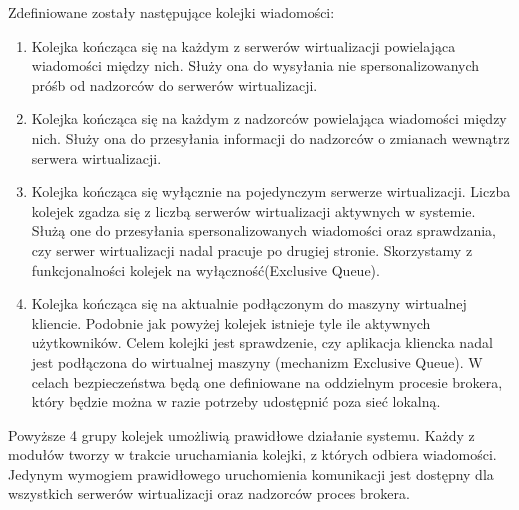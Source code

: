 \documentclass[../opis-rozwiazania.tex]{subfiles}
\begin{document}
Zdefiniowane zostały następujące kolejki wiadomości:
\begin{enumerate}[label=(\Roman*)]
    \item \label{modules:broker:queue-virtsrv} Kolejka kończąca się na każdym z serwerów wirtualizacji powielająca wiadomości między nich.
          Służy ona do wysyłania nie spersonalizowanych próśb od nadzorców do serwerów wirtualizacji.
    \item \label{modules:broker:queue-overseers} Kolejka kończąca się na każdym z nadzorców powielająca wiadomości między nich.
          Służy ona do przesyłania informacji do nadzorców o zmianach wewnątrz serwera wirtualizacji.
    \item \label{modules:broker:queue-exclusive} Kolejka kończąca się wyłącznie na pojedynczym serwerze wirtualizacji.
          Liczba kolejek zgadza się z liczbą serwerów wirtualizacji aktywnych w systemie.
          Służą one do przesyłania spersonalizowanych wiadomości oraz sprawdzania, czy serwer wirtualizacji nadal pracuje po drugiej stronie.
          Skorzystamy z funkcjonalności kolejek na wyłączność(Exclusive Queue\parencite{xrdp-clients}).
    \item \label{modules:broker:queue-users} Kolejka kończąca się na aktualnie podłączonym do maszyny wirtualnej kliencie.
          Podobnie jak powyżej kolejek istnieje tyle ile aktywnych użytkowników.
          Celem kolejki jest sprawdzenie, czy aplikacja kliencka nadal jest podłączona do wirtualnej maszyny (mechanizm Exclusive Queue).
          W celach bezpieczeństwa będą one definiowane na oddzielnym procesie brokera, który będzie można w razie potrzeby udostępnić poza sieć lokalną.
\end{enumerate}

Powyższe 4 grupy kolejek umożliwią prawidłowe działanie systemu.
Każdy z modułów tworzy w trakcie uruchamiania kolejki, z których odbiera wiadomości.
Jedynym wymogiem prawidłowego uruchomienia komunikacji jest dostępny dla wszystkich serwerów wirtualizacji oraz nadzorców proces brokera.

\end{document}

